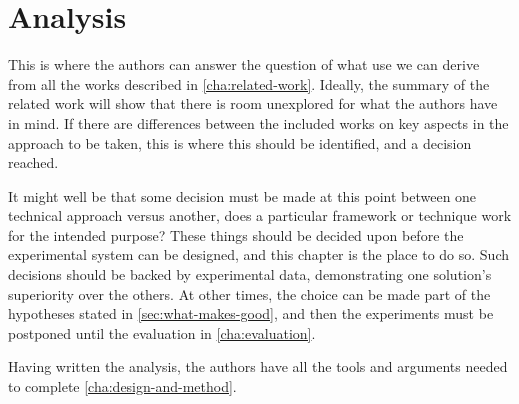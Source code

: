 \chapter{Analysis}
\label{cha:analysis}

This is where the authors can answer the question of what use we can
derive from all the works described in
\autoref{cha:related-work}. Ideally, the summary of the related work
will show that there is room unexplored for what the authors have in
mind. If there are differences between the included works on key
aspects in the approach to be taken, this is where this should be
identified, and a decision reached.

It might well be that some decision must be made at this point between
one technical approach versus another, \eg does a particular framework
or technique work for the intended purpose?  These things should be
decided upon before the experimental system can be designed, and this
chapter is the place to do so. Such decisions should be backed by
experimental data, demonstrating one solution's superiority over the
others. At other times, the choice can be made part of the hypotheses
stated in \autoref{sec:what-makes-good}, and then the experiments must
be postponed until the evaluation in \autoref{cha:evaluation}.

Having written the analysis, the authors have all the tools and
arguments needed to complete \autoref{cha:design-and-method}.



